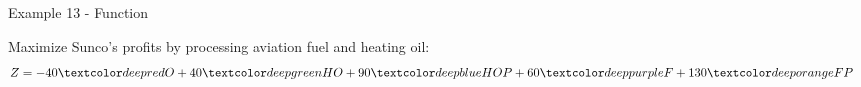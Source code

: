 \begin{frame}{Example 13 - Function}

Maximize Sunco's profits by processing aviation fuel and heating oil: 
\begin{align*}
    Z &= -40\colora{O} + 40\colorb{HO} + 90\colorc{HOP} + 60\colord{F} + 130\colore{FP}
\end{align*}

\end{frame}
